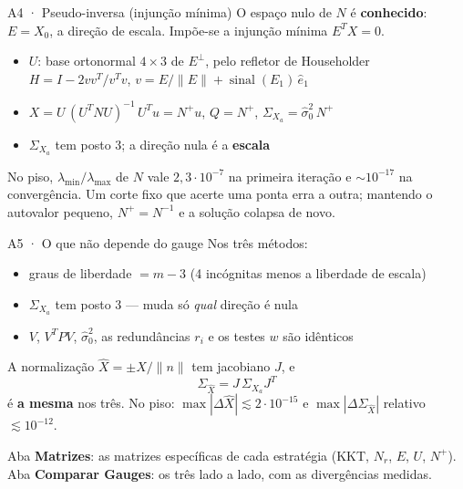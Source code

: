 \documentclass[aspectratio=169,11pt]{beamer}
\begin{document}
\begin{frame}{A4 · Pseudo-inversa (injunção mínima)}
  \small
  O espaço nulo de $N$ é \textbf{conhecido}: $E = X_0$, a direção de escala. Impõe-se a
  injunção mínima $E^T X = 0$.
  \begin{itemize}
    \item $U$: base ortonormal $4\times3$ de $E^\perp$, pelo refletor de Householder
          $H = I - 2vv^T/v^Tv$, \; $v = E/\lVert E\rVert + \operatorname{sinal}(E_1)\,\hat e_1$
    \item $X = U\,(U^T N U)^{-1}\,U^T u = N^{+} u$, \qquad $Q = N^{+}$, \qquad
          $\Sigma_{X_a} = \hat\sigma_0^2\, N^{+}$
    \item $\Sigma_{X_a}$ tem posto 3; a direção nula é a \textbf{escala}
  \end{itemize}
  \medskip
  \begin{armadilha}[title={Por que não detectar o posto por limiar}]
    No piso, $\lambda_{\min}/\lambda_{\max}$ de $N$ vale $2{,}3\cdot10^{-7}$ na primeira
    iteração e $\sim10^{-17}$ na convergência. Um corte fixo que acerte uma ponta erra a
    outra; mantendo o autovalor pequeno, $N^{+} = N^{-1}$ e a solução colapsa de novo.
  \end{armadilha}
\end{frame}

\begin{frame}{A5 · O que não depende do gauge}
  \small
  Nos três métodos:
  \begin{itemize}
    \item graus de liberdade $= m - 3$ \;(4 incógnitas menos a liberdade de escala)
    \item $\Sigma_{X_a}$ tem posto 3 --- muda só \emph{qual} direção é nula
    \item $V$, $V^T P V$, $\hat\sigma_0^2$, as redundâncias $r_i$ e os testes $w$ são idênticos
  \end{itemize}
  \medskip
  A normalização $\hat X = \pm X / \lVert n \rVert$ tem jacobiano $J$, e
  \[ \Sigma_{\hat X} = J\, \Sigma_{X_a} J^T \]
  é \textbf{a mesma} nos três. No piso: $\max|\Delta \hat X| \lesssim 2\cdot10^{-15}$ e
  $\max|\Delta \Sigma_{\hat X}|$ relativo $\lesssim 10^{-12}$.
  \begin{ideia}[title={No simulador}]
    Aba \textbf{Matrizes}: as matrizes específicas de cada estratégia (KKT, $N_r$, $E$, $U$,
    $N^{+}$). Aba \textbf{Comparar Gauges}: os três lado a lado, com as divergências medidas.
  \end{ideia}
\end{frame}
\end{document}
